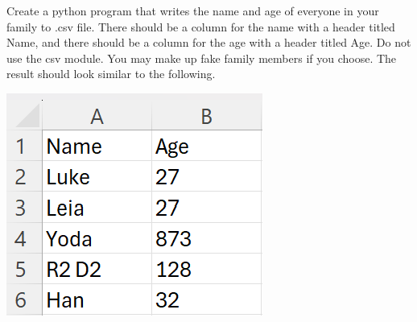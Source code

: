 



	\item 
		Create a python program that writes the name and age of everyone in your family to .csv file.
		There should be a column for the name with a header titled Name, and there should be a column 
		for the age with a header titled Age.
		Do not use the csv module. You may make up fake family members if you choose. The result
		should look similar to the following.
		
		\begin{flushright}
			\includegraphics[scale=.65]{imgs/WritingFamily.PNG}
		\end{flushright}







